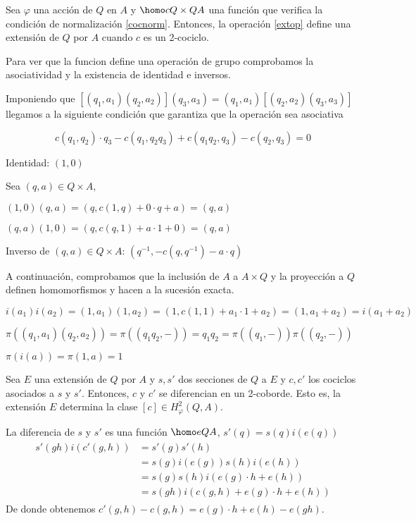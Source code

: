 \begin{proposicion}\label{prop:res1}
Sea $\varphi$ una acción de $Q$ en $A$ y $\homo c {Q\times Q} A$ una función que verifica la condición de normalización \eqref{cocnorm}. Entonces, la operación \eqref{extop} define una extensión de $Q$ por $A$ cuando $c$ es un 2-cociclo.
	\begin{demostracion}
	Para ver que la funcion define una operación de grupo comprobamos la asociatividad y la existencia de identidad e inversos.
	
	Imponiendo que $[(q_1,a_1)(q_2,a_2)](q_3,a_3) = (q_1,a_1)[(q_2,a_2)(q_3,a_3)]$ llegamos a la siguiente condición que garantiza que la operación sea asociativa
	
	\begin{equation}\label{eq2coc}
			c(q_1,q_2)\cdot q_3  - c(q_1,q_2q_3)+ c(q_1q_2,q_3) -c(q_2,q_3) =0
	\end{equation}
	
	Identidad: $(1,0)$
	
	Sea $(q,a)\in Q\times A$,
	
	$(1,0)(q,a) = (q,c(1,q) + 0\cdot q + a) = (q,a)$
	
	$(q,a)(1,0) = (q,c(q,1) + a\cdot 1 + 0) = (q,a)$
	
	Inverso de $(q,a)\in Q\times A$: $(q^{-1}, - c(q,q^{-1})-a\cdot q)$
	
	A continuación, comprobamos que la inclusión de $A$ a $A\times Q$ y la proyección a $Q$ definen homomorfismos y hacen a la sucesión exacta.
	
	$i(a_1)i(a_2)=(1,a_1)(1,a_2) = (1,c(1,1) + a_1\cdot 1 + a_2) = (1,a_1+a_2)=i(a_1+a_2)$
	
	$\pi((q_1,a_1)(q_2,a_2))=\pi((q_1q_2,-)) = q_1q_2 = \pi((q_1,-))\pi((q_2,-))$
	
	$\pi(i(a)) = \pi(1,a) = 1$
	\end{demostracion}
\end{proposicion}

\begin{proposicion}\label{prop:res2}
	Sea $E$ una extensión de $Q$ por $A$ y $s,s'$ dos secciones de $Q$ a $E$ y $c,c'$ los cociclos asociados a $s$ y $s'$. Entonces, $c$ y $c'$ se diferencian en un 2-coborde. Esto es, la extensión $E$ determina la clase $[c]\in H^2_\varphi(Q,A)$.
	
	\begin{demostracion}
		La diferencia de $s$ y $s'$ es una función $\homo e Q {A}$, $s'(q) = s(q)i(e(q))$ %
		\begin{align}\begin{split}
			s'(gh)i(c'(g,h)) &= s'(g)s'(h) \\ &= s(g)i(e(g))s(h)i(e(h))\\ &= s(g)s(h)i(e(g)\cdot h + e(h))  \\ &= s(gh)i(c(g,h) + e(g)\cdot h + e(h))
		\end{split}\end{align}
		De donde obtenemos $c'(g,h)-c(g,h) = e(g)\cdot h + e(h) - e(gh)$.
	\end{demostracion}
\end{proposicion}

